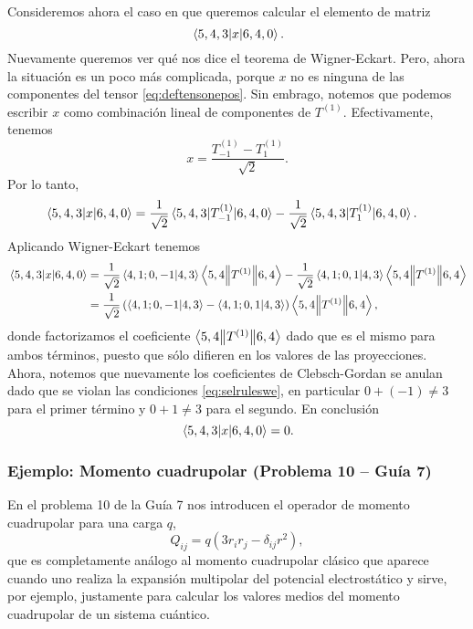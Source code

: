 \documentclass[10pt, a4paper]{article}
\numberwithin{equation}{subsection}
\begin{document}
Consideremos ahora el caso en que queremos calcular el elemento de matriz
\begin{equation}
  \matrixel{5,4,3}{x}{6,4,0}.
\end{equation}
Nuevamente queremos ver qué nos dice el teorema de Wigner-Eckart. Pero, ahora
la situación es un poco más complicada, porque $x$ no es ninguna de las componentes
del tensor \eqref{eq:deftensonepos}. Sin embrago, notemos que podemos escribir
$x$ como combinación lineal de componentes de $T^{(1)}$. Efectivamente,
tenemos
\begin{equation}
  x = \frac{T^{(1)}_{-1} - T^{(1)}_{1}}{\sqrt{2}}.
\end{equation}
Por lo tanto,
\begin{align}
  \matrixel{5,4,3}{x}{6,4,0} &=
  \frac{1}{\sqrt{2}}\matrixel{5,4,3}{T^{(1)}_{-1}}{6,4,0} -
  \frac{1}{\sqrt{2}}\matrixel{5,4,3}{T^{(1)}_{1}}{6,4,0}.
\end{align}
Aplicando Wigner-Eckart tenemos
\begin{align}
  \matrixel{5,4,3}{x}{6,4,0} &=
    \frac{1}{\sqrt{2}}\ClebschGordan{4}{1}{0}{-1}{4}{3}
    \doublebarmel{5,4}{T^{(1)}}{6,4} -
    \frac{1}{\sqrt{2}}\ClebschGordan{4}{1}{0}{1}{4}{3}
    \doublebarmel{5,4}{T^{(1)}}{6,4} \nonumber \\
  &= \frac{1}{\sqrt{2}}\left(\ClebschGordan{4}{1}{0}{-1}{4}{3} -
    \ClebschGordan{4}{1}{0}{1}{4}{3}\right) \doublebarmel{5,4}{T^{(1)}}{6,4},
\end{align}
donde factorizamos el coeficiente $\left\langle{5,4}\middle\|{T^{(1)}}\middle\|{6,4}\right\rangle$ dado que
es el mismo para ambos términos, puesto que sólo difieren en los valores de las
proyecciones. Ahora, notemos que nuevamente los coeficientes de Clebsch-Gordan
se anulan dado que se violan las condiciones \eqref{eq:selruleswe}, en
particular $0 + (-1) \neq 3$ para el primer término y $0 + 1 \neq 3$ para el
segundo. En conclusión
\begin{equation}
  \matrixel{5,4,3}{x}{6,4,0} = 0.
\end{equation}

\subsubsection{Ejemplo: Momento cuadrupolar (Problema 10 -- Guía 7)}

En el problema 10 de la Guía 7 nos introducen el operador de momento
cuadrupolar para una carga $q$,
\begin{equation} \label{eq:def:momentocuadrupolar}
  Q_{ij} = q\left(3r_ir_j - \delta_{ij}r^2\right),
\end{equation}
que es completamente análogo al momento cuadrupolar clásico que aparece cuando
uno realiza la expansión multipolar del potencial electrostático y sirve, por
ejemplo, justamente para calcular los valores medios del momento cuadrupolar de
un sistema cuántico.
\end{document}
